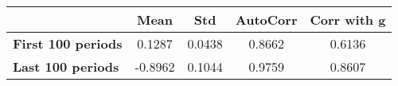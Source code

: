 \begin{tiny}\begin{tabular}{|l|c|c|c|c|}
\hline
&\textbf{Mean}&\textbf{Std}&\textbf{AutoCorr}&\textbf{Corr with g}\\\hline
\textbf{First 100 periods}&0.1287&0.0438&0.8662&0.6136\\\hline
\textbf{Last 100 periods}&-0.8962&0.1044&0.9759&0.8607\\\hline
\end{tabular}
\end{tiny}